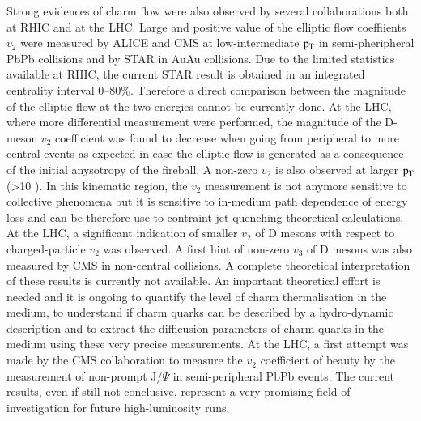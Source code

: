 \documentclass{webofc}
\begin{document}
Strong evidences of charm flow were also observed by several collaborations both at RHIC and at the LHC. Large and positive value of the elliptic flow coeffiients $v_{2}$ were measured by ALICE 
and CMS at low-intermediate $\rm p_{\rm T} $ in semi-pheripheral PbPb collisions and by STAR in AuAu collisions. Due to the limited statistics available at RHIC, the current STAR result is obtained in an integrated 
centrality interval 0--80$\%$. Therefore a direct comparison between the magnitude of the elliptic flow at the two energies cannot be currently done.
At the LHC, where more differential measurement were performed, the magnitude of the D-meson $v_{2}$ coefficient was found to decrease when going from peripheral to more central events as expected 
in case the elliptic flow is generated as a consequence of the initial anysotropy of the fireball.  A non-zero $v_{2}$ is also observed at larger $\rm p_{\rm T} $ (>10 \GeVc). In this kinematic region, the $v_{2}$ measurement is not 
anymore sensitive to collective phenomena but it is sensitive to in-medium path dependence of energy loss and can be therefore use to contraint jet quenching theoretical calculations. At the LHC, a significant indication 
of smaller $v_{2}$ of D mesons with respect to charged-particle $v_{2}$ was observed. A first hint of non-zero $v_{3}$ of D mesons was also measured by CMS in non-central collisions. 
A complete theoretical interpretation of these results is currently not available. An important theoretical effort is needed 
and it is ongoing to quantify the level of charm thermalisation in the medium, to understand if charm quarks can be described by a hydro-dynamic description 
and to extract the difficusion parameters of charm quarks in the medium using these very precise measurements. At the LHC, a first attempt was made by the CMS collaboration to measure the 
$v_{2}$  coefficient of beauty by the measurement of non-prompt J/$\Psi$ in semi-peripheral PbPb events. The current results, even if still not conclusive, represent a very promising field 
of investigation for future high-luminosity runs. 
\end{document}
